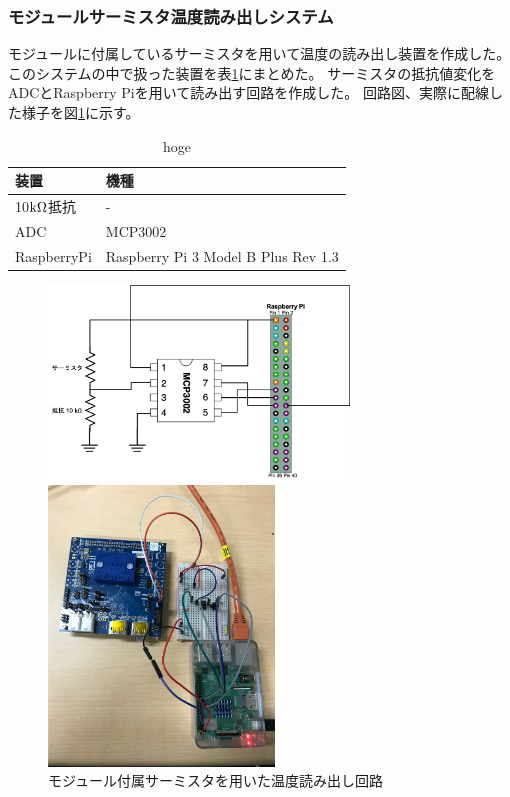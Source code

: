 \subsubsection{モジュールサーミスタ温度読み出しシステム}
モジュールに付属しているサーミスタを用いて温度の読み出し装置を作成した。
このシステムの中で扱った装置を表\ref{demo_temp_device}にまとめた。
サーミスタの抵抗値変化をADCとRaspberry Piを用いて読み出す回路を作成した。
回路図、実際に配線した様子を図\ref{demo_temp_circit_pic}に示す。

\begin{table}[tbp]
\begin{center}
\caption[hoge]{hoge}
\label{demo_temp_device}
  \begin{tabular}{|ll|} \hline
    装置 & 機種 \\ \hline
    10$\rm{k\Omega}$抵抗 & - \\
    ADC & MCP3002\cite{3} \\  
    RaspberryPi &  Raspberry Pi 3 Model B Plus Rev 1.3\cite{4} \\ \hline 
  \end{tabular}
\end{center}
\end{table}

\begin{figure}[h]\centering
  \begin{minipage}{0.5\hsize}
    \includegraphics[width=8cm]{temp_circit}
  \end{minipage}
  \begin{minipage}{0.5\hsize}
    \includegraphics[width=6cm]{temp_circit_pic}
  \end{minipage}
\caption[モジュール付属サーミスタを用いた温度読み出し回路]{モジュール付属サーミスタを用いた温度読み出し回路}
\label{demo_temp_circit_pic}
\end{figure}


